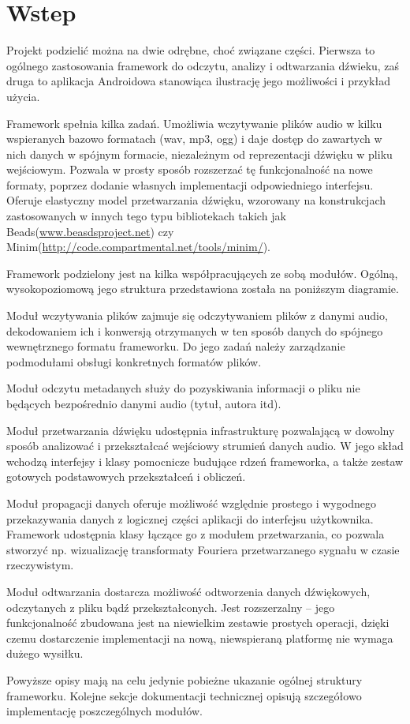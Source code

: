 
\chapter{Wstep}

Projekt podzielić można na dwie odrębne, choć związane części. Pierwsza to ogólnego zastosowania
framework do odczytu, analizy i odtwarzania dźwieku, zaś druga to aplikacja Androidowa stanowiąca
ilustrację jego możliwości i przykład użycia.

Framework spełnia kilka zadań. Umożliwia wczytywanie plików audio w kilku wspieranych bazowo
formatach (wav, mp3, ogg) i daje dostęp do zawartych w nich danych w spójnym formacie, niezależnym
od reprezentacji dźwięku w pliku wejściowym. Pozwala w prosty sposób rozszerzać tę funkcjonalność na
nowe formaty, poprzez dodanie własnych implementacji odpowiedniego interfejsu. Oferuje elastyczny
model przetwarzania dźwięku, wzorowany na konstrukcjach zastosowanych w innych tego typu
bibliotekach takich jak Beads(\url{www.beasdsproject.net}) czy Minim(\url{http://code.compartmental.net/tools/minim/}).

Framework podzielony jest na kilka współpracujących ze sobą modułów. Ogólną, wysokopoziomową jego
struktura przedstawiona została na poniższym diagramie.


Moduł wczytywania plików zajmuje się odczytywaniem plików z danymi audio, dekodowaniem ich i
konwersją otrzymanych w ten sposób danych do spójnego wewnętrznego formatu frameworku. Do jego zadań
należy zarządzanie podmodułami obsługi konkretnych formatów plików.

Moduł odczytu metadanych służy do pozyskiwania informacji o pliku nie będących bezpośrednio danymi
audio (tytuł, autora itd). 

Moduł przetwarzania dźwięku udostępnia infrastrukturę pozwalającą w dowolny sposób analizować i
przekształcać wejściowy strumień danych audio. W jego skład wchodzą interfejsy i klasy pomocnicze
budujące rdzeń frameworka, a także zestaw gotowych podstawowych przekształceń i obliczeń.

Moduł propagacji danych oferuje możliwość względnie prostego i wygodnego przekazywania danych z
logicznej części aplikacji do interfejsu użytkownika. Framework udostępnia klasy łączące go z
modułem przetwarzania, co pozwala stworzyć np. wizualizację transformaty Fouriera przetwarzanego
sygnału w czasie rzeczywistym.

Moduł odtwarzania dostarcza możliwość odtworzenia danych dźwiękowych, odczytanych z pliku bądź
przekształconych. Jest rozszerzalny -- jego funkcjonalność zbudowana jest na niewielkim zestawie
prostych operacji, dzięki czemu dostarczenie implementacji na nową, niewspieraną platformę nie
wymaga dużego wysiłku.

Powyższe opisy mają na celu jedynie pobieżne ukazanie ogólnej struktury frameworku. Kolejne sekcje
dokumentacji technicznej opisują szczegółowo implementację poszczególnych modułów.
